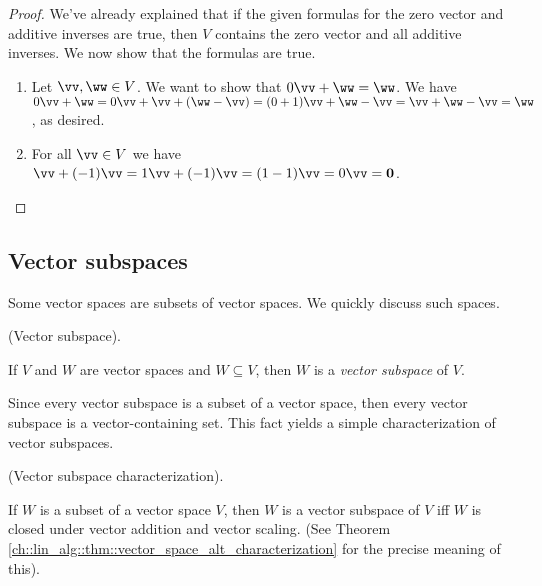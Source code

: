 \begin{proof}
    We've already explained that if the given formulas for the zero vector and additive inverses are true, then $V$ contains the zero vector and all additive inverses. We now show that the formulas are true.

    \begin{enumerate}
        \item Let $\vv, \ww \in V$. We want to show that $0\vv + \ww = \ww$. We have $0\vv + \ww = 0\vv + \vv + (\ww - \vv) = (0 + 1)\vv + \ww - \vv = \vv + \ww - \vv = \ww$, as desired.
        \item For all $\vv \in V$ we have $\vv + (-1)\vv = 1\vv + (-1)\vv = (1 - 1)\vv = 0\vv = \mathbf{0}$.
    \end{enumerate}
\end{proof}

\subsection*{Vector subspaces}

Some vector spaces are subsets of vector spaces. We quickly discuss such spaces.

\begin{defn}
\label{ch::lin_alg::defn::vector_subspace}
    (Vector subspace). 
    
    If $V$ and $W$ are vector spaces and $W \subseteq V$, then $W$ is a \textit{vector subspace} of $V$.
\end{defn}

Since every vector subspace is a subset of a vector space, then every vector subspace is a vector-containing set. This fact yields a simple characterization of vector subspaces.

\begin{theorem}
\label{ch::lin_alg::defn::vector_subspace_characterization}
    (Vector subspace characterization).

    If $W$ is a subset of a vector space $V$, then $W$ is a vector subspace of $V$ iff $W$ is closed under vector addition and vector scaling. (See Theorem \ref{ch::lin_alg::thm::vector_space_alt_characterization} for the precise meaning of this).
\end{theorem}

